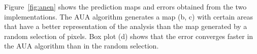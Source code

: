 Figure~\ref{fig:anen} shows the prediction maps and errors obtained from the two
implementations. The AUA algorithm generates a map (b, c) with certain 
areas that have a better representation of the analysis than the map generated 
by a random selection of pixels. Box plot (d) shows that the error converges 
faster in the AUA algorithm than in the random selection.